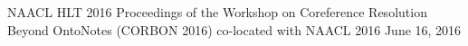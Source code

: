 \documentclass[12pt]{book}
\begin{document}
\noindent
\hspace{-0.7in}
\Large
%
%
NAACL HLT 2016
\hfill
Proceedings of the Workshop on Coreference Resolution Beyond OntoNotes (CORBON 2016) co-located with NAACL 2016
\hfill
June 16, 2016 %
\end{document}
